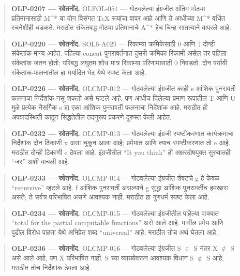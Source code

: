 \begin{quote}\small\textbf{OLP-0207 — स्रोतनोंद.} OLFOL-054 — गोठवलेल्या इंग्रजीत अंतिम मोठ्या प्रतिमानासाठी M\textasciicircum{}* या दोन विसंगत TeX रूपांचा वापर आहे आणि ते आधीच्या M\textasciicircum{}* वर्धित रचनेशीही धडकते. मराठीत संकेतबद्ध मोठ्या प्रतिमानाचे A\textasciicircum{}* हेच चिन्ह सातत्याने वापरले आहे.\end{quote}
\begin{quote}\small\textbf{OLP-0220 — स्रोतनोंद.} SOL6-A029 — रिकाम्या क्रमिकेसाठी 0 आणि 1 दोन्ही संकेतांक मान्य आहेत. पहिल्या concat पुनरावर्तनात दुसरी क्रमिका रिकामी असेल तर पहिला संकेतांक जतन होतो; परिबद्ध लघुतम शोध मात्र रिकाम्या परिणामासाठी 0 निवडतो. दोन पर्यायी संकेतांक-फलनांतील हा मर्यादित भेद येथे स्पष्ट केला आहे.\end{quote}
\begin{quote}\small\textbf{OLP-0226 — स्रोतनोंद.} OLCMP-012 — गोठवलेल्या इंग्रजीत काही e आंशिक पुनरावर्ती फलनाचा निर्देशांक नसू शकतो असे म्हटले आहे. पण आधीच दिलेल्या प्रमाण रूपातील T आणि U मुळे प्रत्येक नैसर्गिक e हा एका आंशिक पुनरावर्ती फलनाचा निर्देशांक आहे. मराठीत ही अपवादस्थिती काढून सिद्धतेतील तदनुरूप प्रकरणे दुरुस्त केली आहेत.\end{quote}
\begin{quote}\small\textbf{OLP-0232 — स्रोतनोंद.} OLCMP-013 — गोठवलेल्या इंग्रजी स्पष्टीकरणात कार्यक्रमाचा निर्देशांक दोन ठिकाणी x असा चुकून आला आहे; प्रमेयात आणि त्याच स्पष्टीकरणात तो e आहे. मराठीत दोन्ही ठिकाणी e ठेवला आहे. इंग्रजीतील ``It you think'' ही अक्षरदोषयुक्त सुरुवातही ``जर'' अशी वाचली आहे.\end{quote}
\begin{quote}\small\textbf{OLP-0233 — स्रोतनोंद.} OLCMP-014 — गोठवलेल्या इंग्रजीत शेवटचे g हे केवळ ``recursive'' म्हटले आहे. f आंशिक पुनरावर्ती असल्याने g सुद्धा आंशिक पुनरावर्तीच हमखास असते; ते सर्वत्र परिभाषित असणे आवश्यक नाही. मराठीत हा गुणधर्म स्पष्ट केला आहे.\end{quote}
\begin{quote}\small\textbf{OLP-0234 — स्रोतनोंद.} OLCMP-015 — गोठवलेल्या इंग्रजीतील पहिल्या वाक्यात ``total for the partial computable functions'' असे आले आहे. मागील प्रमेय आणि पुढील विरोध पाहता येथे अभिप्रेत शब्द ``universal'' आहे; मराठीत तोच अर्थ घेतला आहे.\end{quote}
\begin{quote}\small\textbf{OLP-0236 — स्रोतनोंद.} OLCMP-016 — गोठवलेल्या इंग्रजीत S \ensuremath{\in} S नंतर X \ensuremath{\notin} S असे आले आहे, पण X परिभाषित नाही. S च्या व्याख्येवरून आवश्यक विधान S \ensuremath{\notin} S आहे; मराठीत तोच निर्देशांक ठेवला आहे.\end{quote}
